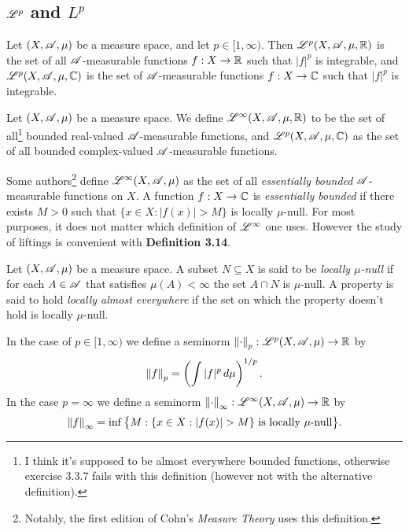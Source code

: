 \documentclass[12pt]{article}
\begin{document}
\subsection{$\mathscr{L}^p$ and $L^p$}
\begin{definition}[$\mathscr{L}^p$]
    Let $(X,\mathscr{A},\mu)$ be a measure space, and let $p\in [1,\infty)$. Then $\mathscr{L}^p(X,\mathscr{A},\mu,\mathbb{R})$ is the set of all $\mathscr{A}$-measurable functions $f:X\to \mathbb{R}$ such that $|f|^p$ is integrable, and $\mathscr{L}^p(X,\mathscr{A},\mu,\mathbb{C})$ is the set of $\mathscr{A}$-measurable functions $f:X\to\mathbb{C}$ such that $|f|^p$ is integrable.
\end{definition}
\begin{definition}[$\Lscr^\infty$]
    Let $(X,\mathscr{A},\mu)$ be a measure space. We define $\mathscr{L}^\infty(X,\mathscr{A},\mu,\mathbb{R})$ to be the set of all\footnote{I think it's supposed to be almost everywhere bounded functions, otherwise exercise 3.3.7 fails with this definition (however not with the alternative definition).} bounded real-valued $\mathscr{A}$-measurable functions, and $\mathscr{L}^p(X,\mathscr{A},\mu,\mathbb{C})$ as the set of all bounded complex-valued $\mathscr{A}$-measurable functions.
\end{definition}
\begin{remark}
    Some authors\footnote{Notably, the first edition of Cohn's \textit{Measure Theory} uses this definition.} define $\mathscr{L}^\infty(X,\mathscr{A},\mu)$ as the set of all \textit{essentially bounded} $\mathscr{A}$-measurable functions on $X$. A function $f:X\to \mathbb{C}$ is \textit{essentially bounded} if there exists $M>0$ such that $\{x\in X: |f(x)|>M\}$ is locally $\mu$-null. For most purposes, it does not matter which definition of $\Lscr^\infty$ one uses. However the study of liftings is convenient with \textbf{Definition 3.14}.
\end{remark}
\begin{definition}
    Let $(X,\mathscr{A},\mu)$ be a measure space. A subset $N\subseteq X$ is said to be \textit{locally $\mu$-null} if for each $A\in\mathscr{A}$ that satisfies $\mu(A)<\infty$ the set $A\cap N$ is $\mu$-null. A property is said to hold \textit{locally almost everywhere} if the set on which the property doesn't hold is locally $\mu$-null.
\end{definition}
\begin{definition}
    In the case of $p\in [1,\infty)$ we define a seminorm $\left\lVert\cdot\right\rVert_p:\mathscr{L}^p(X,\mathscr{A},\mu)\to\mathbb{R}$ by
    \begin{equation*}
        \left\lVert f\right\rVert_p=\left(\int |f|^p \, d\mu \right)^{1/p}.
    \end{equation*}
    In the case $p=\infty$ we define a seminorm $\left\lVert\cdot\right\rVert_\infty:\mathscr{L}^\infty(X,\mathscr{A},\mu)\to \mathbb{R}$ by
    \begin{equation*}
        \norm{f}_\infty = \inf \big\{ M: \{x\in X: |f(x)|>M\} \text{ is locally $\mu$-null}\big\}.
    \end{equation*}
\end{definition}
\end{document}
